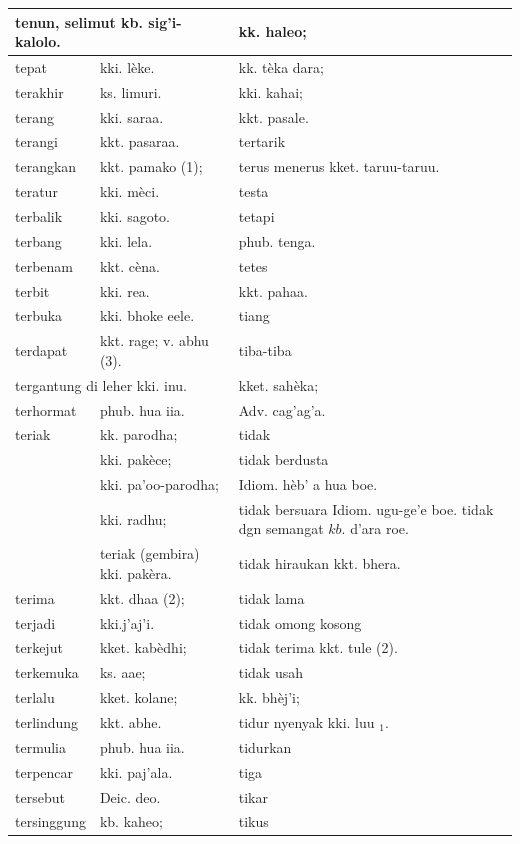 \documentclass[10pt]{article}
\begin{document}
\begin{center}
\begin{tabular}{|l|l|l|}
\hline
\multicolumn{2}{|l|}{tenun, selimut kb. sig'i-kalolo.} & kk. haleo; \\
\hline
tepat & kki. lèke. & kk. tèka dara; \\
\hline
terakhir & ks. limuri. & kki. kahai; \\
\hline
terang & kki. saraa. & kkt. pasale. \\
\hline
terangi & kkt. pasaraa. & tertarik \\
\hline
terangkan & kkt. pamako (1); & terus menerus kket. taruu-taruu. \\
\hline
teratur & kki. mèci. & testa \\
\hline
terbalik & kki. sagoto. & tetapi \\
\hline
terbang & kki. lela. & phub. tenga. \\
\hline
terbenam & kkt. cèna. & tetes \\
\hline
terbit & kki. rea. & kkt. pahaa. \\
\hline
terbuka & kki. bhoke eele. & tiang \\
\hline
terdapat & kkt. rage; v. abhu (3). & tiba-tiba \\
\hline
\multicolumn{2}{|l|}{tergantung di leher kki. inu.} & kket. sahèka; \\
\hline
terhormat & phub. hua iia. & Adv. cag'ag'a. \\
\hline
teriak & kk. parodha; & tidak \\
\hline
 & kki. pakèce; & tidak berdusta \\
\hline
 & kki. pa'oo-parodha; & Idiom. hèb' a hua boe. \\
\hline
 & kki. radhu; & tidak bersuara Idiom. ugu-ge'e boe. tidak dgn semangat \(k b\). d'ara roe. \\
\hline
 & teriak (gembira) kki. pakèra. & tidak hiraukan kkt. bhera. \\
\hline
terima & kkt. dhaa (2); & tidak lama \\
\hline
terjadi & kki.j'aj'i. & tidak omong kosong \\
\hline
terkejut & kket. kabèdhi; & tidak terima kkt. tule (2). \\
\hline
terkemuka & ks. aae; & tidak usah \\
\hline
terlalu & kket. kolane; & kk. bhèj'i; \\
\hline
terlindung & kkt. abhe. & tidur nyenyak kki. luu \({ }_{1}\). \\
\hline
termulia & phub. hua iia. & tidurkan \\
\hline
terpencar & kki. paj'ala. & tiga \\
\hline
tersebut & Deic. deo. & tikar \\
\hline
tersinggung & kb. kaheo; & tikus \\
\hline
\end{tabular}
\end{center}
\end{document}
